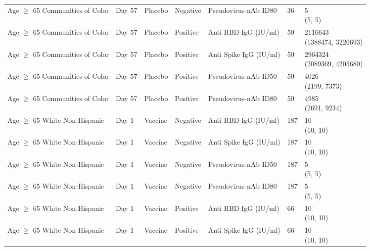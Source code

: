 \documentclass[]{book}
\theoremstyle{definition}
\theoremstyle{definition}
\theoremstyle{definition}
\newcommand{\1}{\mathbbm{1}}
\begin{document}
\begin{landscape}
\begin{ThreePartTable}
\begin{longtable}[t]{>{\raggedright\arraybackslash}p{7cm}llllll}
\hspace{1em}Age $\geq$ 65 Communities of Color & Day 57 & Placebo & Negative & Pseudovirus-nAb ID80 & 36 & \makecell[l]{5\\(5, 5)}\\
\hspace{1em}Age $\geq$ 65 Communities of Color & Day 57 & Placebo & Positive & Anti RBD IgG (IU/ml) & 50 & \makecell[l]{2116643\\(1388474, 3226693)}\\
\hspace{1em}Age $\geq$ 65 Communities of Color & Day 57 & Placebo & Positive & Anti Spike IgG (IU/ml) & 50 & \makecell[l]{2964324\\(2089369, 4205680)}\\
\hspace{1em}Age $\geq$ 65 Communities of Color & Day 57 & Placebo & Positive & Pseudovirus-nAb ID50 & 50 & \makecell[l]{4026\\(2199, 7373)}\\
\hspace{1em}Age $\geq$ 65 Communities of Color & Day 57 & Placebo & Positive & Pseudovirus-nAb ID80 & 50 & \makecell[l]{4985\\(2691, 9234)}\\
\hspace{1em}Age $\geq$ 65 White Non-Hispanic & Day 1 & Vaccine & Negative & Anti RBD IgG (IU/ml) & 187 & \makecell[l]{10\\(10, 10)}\\
\hspace{1em}Age $\geq$ 65 White Non-Hispanic & Day 1 & Vaccine & Negative & Anti Spike IgG (IU/ml) & 187 & \makecell[l]{10\\(10, 10)}\\
\hspace{1em}Age $\geq$ 65 White Non-Hispanic & Day 1 & Vaccine & Negative & Pseudovirus-nAb ID50 & 187 & \makecell[l]{5\\(5, 5)}\\
\hspace{1em}Age $\geq$ 65 White Non-Hispanic & Day 1 & Vaccine & Negative & Pseudovirus-nAb ID80 & 187 & \makecell[l]{5\\(5, 5)}\\
\hspace{1em}Age $\geq$ 65 White Non-Hispanic & Day 1 & Vaccine & Positive & Anti RBD IgG (IU/ml) & 66 & \makecell[l]{10\\(10, 10)}\\
\hspace{1em}Age $\geq$ 65 White Non-Hispanic & Day 1 & Vaccine & Positive & Anti Spike IgG (IU/ml) & 66 & \makecell[l]{10\\(10, 10)}\\

\end{longtable}
\end{ThreePartTable}
\end{landscape}
\end{document}
